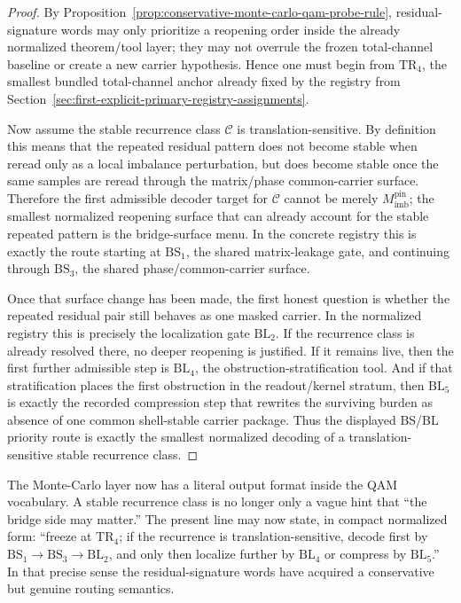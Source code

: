 \begin{proof}
By Proposition~\ref{prop:conservative-monte-carlo-qam-probe-rule}, residual-signature words may only prioritize a reopening order inside the already normalized theorem/tool layer; they may not overrule the frozen total-channel baseline or create a new carrier hypothesis. Hence one must begin from \(\mathrm{TR}_4\), the smallest bundled total-channel anchor already fixed by the registry from Section~\ref{sec:first-explicit-primary-registry-assignments}.

Now assume the stable recurrence class \(\mathcal C\) is translation-sensitive. By definition this means that the repeated residual pattern does not become stable when reread only as a local imbalance perturbation, but does become stable once the same samples are reread through the matrix/phase common-carrier surface. Therefore the first admissible decoder target for \(\mathcal C\) cannot be merely \(M^{\mathrm{pin}}_{\mathrm{imb}}\); the smallest normalized reopening surface that can already account for the stable repeated pattern is the bridge-surface menu. In the concrete registry this is exactly the route starting at \(\mathrm{BS}_1\), the shared matrix-leakage gate, and continuing through \(\mathrm{BS}_3\), the shared phase/common-carrier surface.

Once that surface change has been made, the first honest question is whether the repeated residual pair still behaves as one masked carrier. In the normalized registry this is precisely the localization gate \(\mathrm{BL}_2\). If the recurrence class is already resolved there, no deeper reopening is justified. If it remains live, then the first further admissible step is \(\mathrm{BL}_4\), the obstruction-stratification tool. And if that stratification places the first obstruction in the readout/kernel stratum, then \(\mathrm{BL}_5\) is exactly the recorded compression step that rewrites the surviving burden as absence of one common shell-stable carrier package. Thus the displayed BS/BL priority route is exactly the smallest normalized decoding of a translation-sensitive stable recurrence class.
\end{proof}

\begin{remark}
\label{rem:what-the-first-monte-carlo-to-route-decoding-buys}
The Monte-Carlo layer now has a literal output format inside the QAM vocabulary. A stable recurrence class is no longer only a vague hint that ``the bridge side may matter.'' The present line may now state, in compact normalized form: ``freeze at \(\mathrm{TR}_4\); if the recurrence is translation-sensitive, decode first by \(\mathrm{BS}_1\to\mathrm{BS}_3\to\mathrm{BL}_2\), and only then localize further by \(\mathrm{BL}_4\) or compress by \(\mathrm{BL}_5\).'' In that precise sense the residual-signature words have acquired a conservative but genuine routing semantics.
\end{remark}



